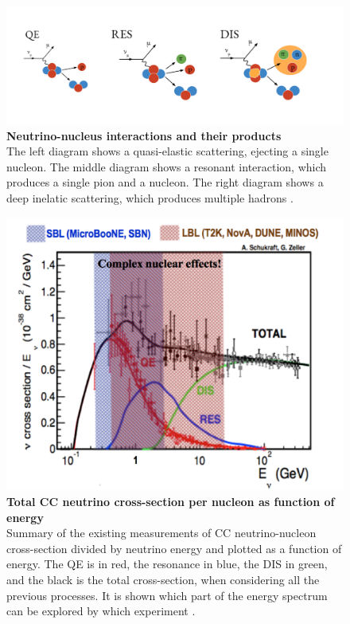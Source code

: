 \begin{figure}[h!]
	\begin{center}
		\includegraphics[scale=0.15]{Figures/neutrino_int_processes.jpeg}
		\caption[Neutrino-nucleus interactions and their products]{ {\textbf{Neutrino-nucleus interactions and their products}} \\ The left diagram shows a quasi-elastic scattering, ejecting a single nucleon. The middle diagram shows a resonant interaction, which produces a single pion and a nucleon. The right diagram shows a deep inelatic scattering, which produces multiple hadrons \cite{afro_phd}.}
		\label{nu_nucleus_int}	
	\end{center}
\end{figure}

\begin{figure}[h!]
	\begin{center}
		\includegraphics[scale=0.6]{Figures/nu_scatter_experiments.png}
		\caption[Total CC neutrino cross-section per nucleon as function of energy]{ {\textbf{Total CC neutrino cross-section per nucleon as function of energy}} \\ Summary of the existing measurements of CC neutrino-nucleon cross-section divided by neutrino energy and plotted as a function of energy. The QE is in red, the resonance in blue, the DIS in green, and the black is the total cross-section, when considering all the previous processes. It is shown which part of the energy spectrum can be explored by which experiment \cite{nu_scatter}.}
		\label{nu_scatter}	
	\end{center}
\end{figure}

